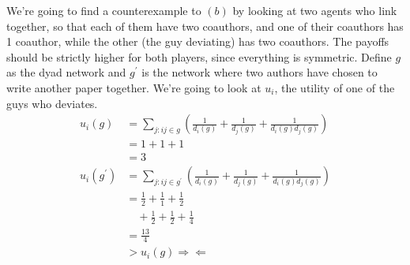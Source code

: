 \begin{enumerate}
\begin{definition}
\begin{enumerate}
      \end{enumerate}
    \end{definition}
    We're going to find a counterexample to $(b)$ by looking at two agents who link together, so that each of them have two coauthors, and one of their coauthors has 1 coauthor, while the other (the guy deviating) has two coauthors. The payoffs should be strictly higher for both players, since everything is symmetric. Define $g$ as the dyad network and $g^\prime$ is the network where two authors have chosen to write another paper together. We're going to look at $u_i$, the utility of one of the guys who deviates.
    \begin{align*}
      u_i(g) &= \sum_{j: ij \in g} \left(\frac{1}{d_i(g)} + \frac{1}{d_j (g)} + \frac{1}{d_i(g) d_j(g)}\right)\\
             &= 1 + 1 + 1\\
      &= 3\\
      u_i(g^\prime) &= \sum_{j: ij \in g^\prime} \left(\frac{1}{d_i(g)} + \frac{1}{d_j (g)} + \frac{1}{d_i(g) d_j(g)}\right)\\
             &= \frac{1}{2} + \frac{1}{1} + \frac{1}{2}\\
             &\quad + \frac{1}{2} + \frac{1}{2} + \frac{1}{4}\\
             &= \frac{13}{4}\\
      &> u_i(g) \Rightarrow\Leftarrow
    \end{align*}
\end{enumerate}

